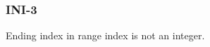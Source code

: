 \subsubsection{INI-3}\label{sec:error_code_ini_3}

Ending index in range index is not an integer.


